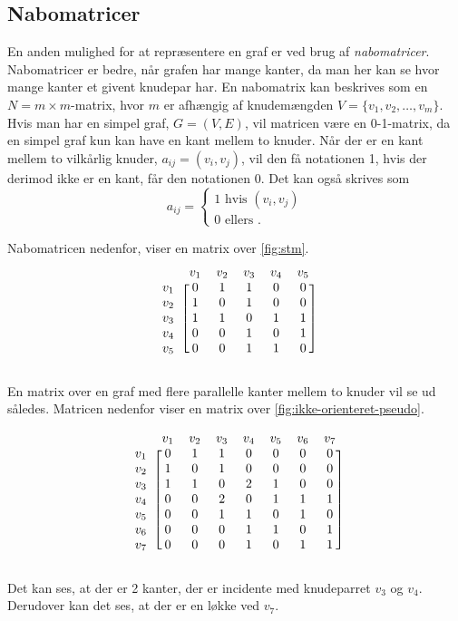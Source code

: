 \subsection{Nabomatricer}
En anden mulighed for at repræsentere en graf er ved brug af \emph{nabomatricer}. Nabomatricer er bedre, når grafen har mange kanter, da man her kan se hvor mange kanter et givent knudepar har.
En nabomatrix kan beskrives som en $N=m \times m$-matrix, hvor $m$ er afhængig af knudemængden $V=\{v_1, v_2, \dotsc, v_m\}$. Hvis man har en simpel graf, $G=(V,E)$, vil matricen være en 0-1-matrix, da en simpel graf kun kan have en kant mellem to knuder. Når der er en kant mellem to  vilkårlig knuder, $a_{ij}=(v_i,v_j)$,  vil den få notationen 1, hvis der derimod ikke er en kant, får den notationen 0.
Det kan også skrives som
\begin{equation}
	a_{ij} =	
	\begin{cases}
		1 \mbox{ hvis } (v_i,v_j) \\
		0 \mbox{ ellers }.
	\end{cases}
\end{equation}



Nabomatricen nedenfor, viser en matrix over \autoref{fig:stm}.
\begin{equation}
\begin{blockarray}{cccccc}
		&v_1&v_2&v_3&v_4&v_5 \\
\begin{block}{c[ccccc]}
		v_1&0&1&1&0&0 \\
		v_2&1&0&1&0&0 \\
		v_3&1&1&0&1&1 \\
		v_4&0&0&1&0&1 \\
		v_5&0&0&1&1&0 \\
\end{block}
\end{blockarray}
\end{equation}

En matrix over en graf med flere parallelle kanter mellem to knuder vil se ud således. Matricen nedenfor viser en matrix over \autoref{fig:ikke-orienteret-pseudo}.

\begin{equation}
\begin{blockarray}{cccccccc}
	&v_1&v_2&v_3&v_4&v_5&v_6&v_7 \\
\begin{block}{c[ccccccc]}
	v_1&0&1&1&0&0&0&0 \\
	v_2&1&0&1&0&0&0&0 \\
	v_3&1&1&0&2&1&0&0 \\
	v_4&0&0&2&0&1&1&1 \\
	v_5&0&0&1&1&0&1&0 \\
	v_6&0&0&0&1&1&0&1 \\
	v_7&0&0&0&1&0&1&1 \\
\end{block}
\end{blockarray}	
\end{equation}

Det kan ses, at der er 2 kanter, der er incidente med knudeparret $v_3$ og $v_4$. Derudover kan det ses, at der er en løkke ved $v_7$.

